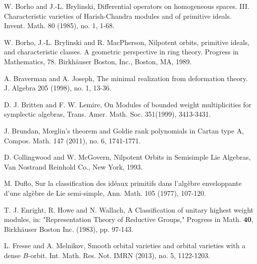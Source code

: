 \documentclass{amsart}[12pt]
\numberwithin{equation}{section}
\begin{document}
\begin{thebibliography}{99}
 W. Borho and J.-L. Brylinski,  Differential operators on homogeneous spaces. III. Characteristic varieties of Harish-Chandra modules and of primitive ideals. { Invent. Math.} { 80} (1985), no. 1, 1-68.

 W. Borho, J.-L. Brylinski and
R. MacPherson, Nilpotent orbits, primitive ideals, and characteristic classes. A geometric perspective in ring theory. Progress in Mathematics, 78. Birkh\"{a}user Boston, Inc., Boston, MA, 1989. 


A. Braverman and A. Joseph,
The minimal realization from deformation theory.
J. Algebra 205 (1998), no. 1, 13-36.


D. J. Britten and F. W. Lemire,   On Modules of bounded weight multiplicities for symplectic algebras,  Trans. Amer. Math. Soc. 351(1999), 3413-3431.


 J. Brundan,
M{\oe}glin's theorem and Goldie rank polynomials in Cartan type A, Compos. Math. 147 (2011), no. 6, 1741-1771.



D. Collingwood and W. McGovern, Nilpotent Orbits in Semisimple Lie Algebras, Van Nostrand Reinhold Co.,
New York, 1993.




M. Duflo,  Sur la classification des id\'{e}aux primitifs dans l'alg\`{e}bre enveloppante d'une alg\`{e}bre de Lie semi-simple, Ann. Math. 105 (1977), 107-120.






T. J. Enright, R. Howe and N. Wallach, A Classification of unitary highest weight modules, in: "Representation
Theory of Reductive Groups," Progress in Math. {\bf 40}, Birkh\"{a}user
Boston Inc. (1983), pp. 97-143.
%
%
%
%


L. Fresse and A. Melnikov,  Smooth orbital varieties and orbital varieties with a dense $B$-orbit. Int. Math. Res. Not. IMRN  (2013),  no. 5, 1122-1203.





\end{thebibliography}
\end{document}

